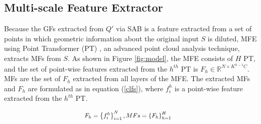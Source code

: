 \documentclass{article}
\begin{document}
\subsection{Multi-scale Feature Extractor}
\label{sec:cascade_local_feature_extractor}
\quad Because the GFs extracted from $Q'$ via SAB is a feature extracted from a set of points in which geometric information about the original input $S$ is diluted, MFE using Point Transformer (PT) \cite{zhao2021point}, an advanced point cloud analysis technique, extracts MFs from $S$. As shown in Figure \ref{fig:model}, the MFE consists of $H$ PT, and the set of point-wise features extracted from the $h^{th}$ PT is $F_h \in \mathbb{R}^{N \times K^{h-1}C}$. MFs are the set of $F_h$ extracted from all layers of the MFE. The extracted MFs and $F_h$ are formulated as in equation (\ref{clfs}), where $f_i^h$ is a point-wise feature extracted from the $h^{th}$ PT.

\begin{center}
\begin{equation}\label{clfs}
\scalebox{0.87}{$\begin{aligned}
    &F_h=\left\{f_{i}^{h}\right\}_{i=1}^N, MFs=\left\{F_h\right\}_{h=1}^H
\end{aligned}$}
\end{equation}
\end{center}
\end{document}
